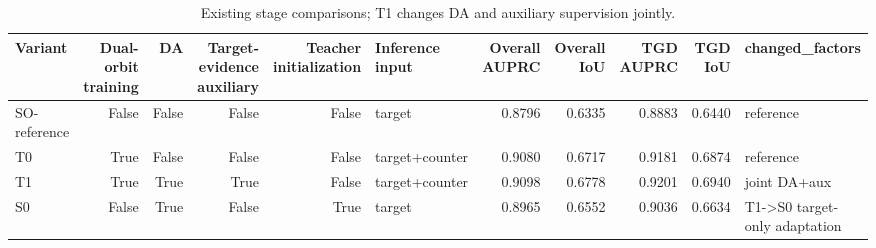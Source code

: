 \begin{table}[t]
\centering
\begin{tabular}{lrrrrlrrrrl}
\toprule
Variant & Dual-orbit training & DA & Target-evidence auxiliary & Teacher initialization & Inference input & Overall AUPRC & Overall IoU & TGD AUPRC & TGD IoU & changed\_factors \\
\midrule
SO-reference & False & False & False & False & target & 0.8796 & 0.6335 & 0.8883 & 0.6440 & reference \\
T0 & True & False & False & False & target+counter & 0.9080 & 0.6717 & 0.9181 & 0.6874 & reference \\
T1 & True & True & True & False & target+counter & 0.9098 & 0.6778 & 0.9201 & 0.6940 & joint DA+aux \\
S0 & False & True & False & True & target & 0.8965 & 0.6552 & 0.9036 & 0.6634 & T1->S0 target-only adaptation \\
\bottomrule
\end{tabular}
\caption{Existing stage comparisons; T1 changes DA and auxiliary supervision jointly.}\label{tab:components}
\end{table}

